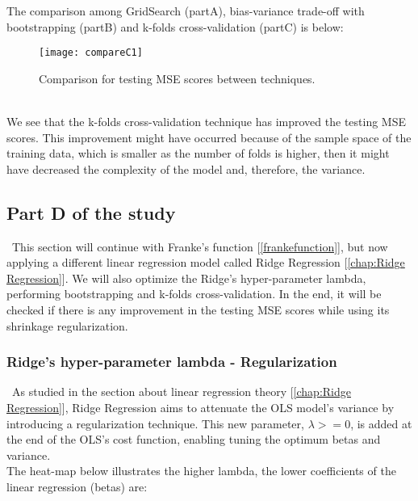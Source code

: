 The comparison among GridSearch (partA), bias-variance trade-off with bootstrapping (partB) and k-folds cross-validation (partC) is below: \\

\begin{figure}[H]
\label{fig:compareC1}
\centering
\texttt{[image: compareC1]}
\caption{Comparison for testing MSE scores between techniques.}
\end{figure}\\

We see that the k-folds cross-validation technique has improved the testing MSE scores. This improvement might have occurred because of the sample space of the training data, which is smaller as the number of folds is higher, then it might have decreased the complexity of the model and, therefore, the variance.\\

\subsection{Part D of the study}
\label{chap:Part D of the study}

\quad \, This section will continue with Franke's function [\ref{frankefunction}], but now applying a different linear regression model called Ridge Regression [\ref{chap:Ridge Regression}]. We will also optimize the Ridge's hyper-parameter lambda, performing bootstrapping and k-folds cross-validation. In the end, it will be checked if there is any improvement in the testing MSE scores while using its shrinkage regularization.\\

\subsubsection{Ridge's hyper-parameter lambda - Regularization}
\label{chap:Ridge's hyper-parameter lambda - Regularization}

\quad \, As studied in the section about linear regression theory [\ref{chap:Ridge Regression}], Ridge Regression aims to attenuate the OLS model's variance by introducing a regularization technique. This new parameter, $\lambda >= 0$, is added at the end of the OLS's cost function, enabling tuning the optimum betas and variance. \\

The heat-map below illustrates the higher lambda, the lower coefficients of the linear regression (betas) are: \\

